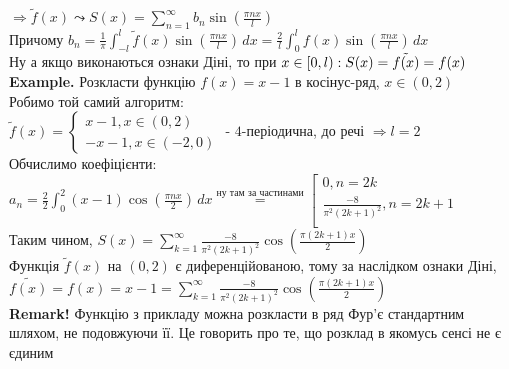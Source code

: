 \documentclass{math_library}
\begin{document}
$\Rightarrow \tilde{f}(x) \leadsto S(x) = \displaystyle \sum_{n=1}^{\infty} b_n \sin \left( \frac{\pi n x}{l} \right)$\\
Причому $b_n = \displaystyle \frac{1}{\pi} \int_{-l}^{l} \tilde{f}(x) \sin \left( \frac{\pi n x}{l} \right) \,dx = \frac{2}{l} \int_0^l f(x) \sin \left( \frac{\pi n x}{l} \right)\,dx$\\
Ну а якщо виконаються ознаки Діні, то при $x \in [0,l): \\ S(x) = \tilde{f(x)} = f(x)$
\bigskip \\
\textbf{Example. } Розкласти функцію $f(x) = x-1$ в косінус-ряд, $x \in (0,2)$\\
Робимо той самий алгоритм:\\
$\tilde{f}(x) = \begin{cases} x-1, x \in (0,2) \\ -x-1, x \in (-2,0) \end{cases}$ - $4$-періодична, до речі $\Rightarrow l =2$ \\
Обчислимо коефіцієнти:\\
$\displaystyle a_n = \frac{2}{2} \int_0^2 (x-1)\cos \left(\frac{\pi n x}{2} \right)\,dx \overset{\textrm{ну там за частинами}}{=} \left[ 
      \begin{gathered} 
        0, n = 2k \\ 
        \frac{-8}{\pi^2(2k+1)^2} , n = 2k+1 \\ 
      \end{gathered} 
\right.$\\
Таким чином, $S(x) = \displaystyle \sum_{k=1}^{\infty} \frac{-8}{\pi^2(2k+1)^2} \cos \left(\frac{\pi (2k+1) x}{2} \right)$\\
Функція $\tilde{f}(x)$ на $(0,2)$ є диференційованою, тому за наслідком ознаки Діні,\\
$\tilde{f(x)} = f(x) = x-1 = \displaystyle \sum_{k=1}^{\infty} \frac{-8}{\pi^2(2k+1)^2} \cos \left(\frac{\pi (2k+1) x}{2} \right)$\\
\textbf{Remark!} Функцію з прикладу можна розкласти в ряд Фур'є стандартним шляхом, не подовжуючи її. Це говорить про те, що розклад в якомусь сенсі не є єдиним
\bigskip \\
\end{document}

